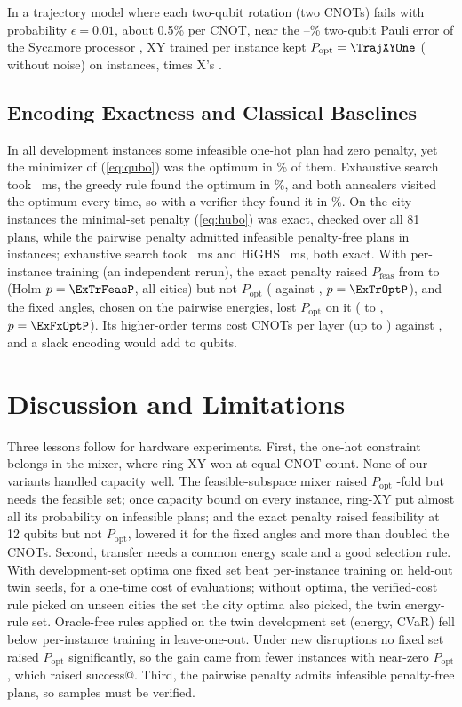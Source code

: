 \documentclass[conference]{IEEEtran}
\begin{document}
In a trajectory model where each two-qubit rotation (two CNOTs) fails with probability $\epsilon=0.01$, about 0.5\% per CNOT, near the \SycIso--\SycSim\% two-qubit Pauli error of the Sycamore processor \cite{Arute2019}, XY trained per instance kept $P_{\mathrm{opt}}=\TrajXYOne$ (\TrajIdealXY{} without noise) on \TrajInst{} instances, \TrajRatioOne{} times X's \TrajXOne.

\subsection{Encoding Exactness and Classical Baselines}
In all \ZeroPenInfeasAll{} development instances some infeasible one-hot plan had zero penalty, yet the minimizer of (\ref{eq:qubo}) was the optimum in \QuboExact\% of them. Exhaustive search took \ExactMs~ms, the greedy rule found the optimum in \GreedyOpt\%, and both annealers visited the optimum every time, so with a verifier they found it in \SAohVer\%. On the \ExN{} city instances the minimal-set penalty (\ref{eq:hubo}) was exact, checked over all 81 plans, while the pairwise penalty admitted \ExMissPlans{} infeasible penalty-free plans in \ExMissInst{} instances; exhaustive search took \ExExactMs~ms and HiGHS \ExMilpMs~ms, both exact. With per-instance training (an independent rerun), the exact penalty raised $P_{\mathrm{feas}}$ from \ExTrFeasPair{} to \ExTrFeasHubo{} (Holm $p=\ExTrFeasP$, all \ExFeasCities{} cities) but not $P_{\mathrm{opt}}$ (\ExTrOptPair{} against \ExTrOptHubo, $p=\ExTrOptP$), and the fixed angles, chosen on the pairwise energies, lost $P_{\mathrm{opt}}$ on it (\ExFxOptPair{} to \ExFxOptHubo, $p=\ExFxOptP$). Its higher-order terms cost \ExCnotHubo{} CNOTs per layer (up to \ExCnotHuboMax) against \ExCnotPair, and a slack encoding would add \ExSlackMin{} to \ExSlackMax{} qubits.


\section{Discussion and Limitations}
Three lessons follow for hardware experiments. First, the one-hot constraint belongs in the mixer, where ring-XY won at equal CNOT count. None of our variants handled capacity well. The feasible-subspace mixer raised $P_{\mathrm{opt}}$ \FgOverXYZero-fold but needs the feasible set; once capacity bound on every instance, ring-XY put almost all its probability on infeasible plans; and the exact penalty raised feasibility at 12 qubits but not $P_{\mathrm{opt}}$, lowered it for the fixed angles and more than doubled the CNOTs. Second, transfer needs a common energy scale and a good selection rule. With development-set optima one fixed set beat per-instance training on held-out twin seeds, for a one-time cost of \OffTotal{} evaluations; without optima, the verified-cost rule picked on unseen cities the set the city optima also picked, the twin energy-rule set. Oracle-free rules applied on the twin development set (energy, CVaR) fell below per-instance training in leave-one-out. Under new disruptions no fixed set raised $P_{\mathrm{opt}}$ significantly, so the gain came from fewer instances with near-zero $P_{\mathrm{opt}}$, which raised success@\Shots. Third, the pairwise penalty admits infeasible penalty-free plans, so samples must be verified.
\end{document}

